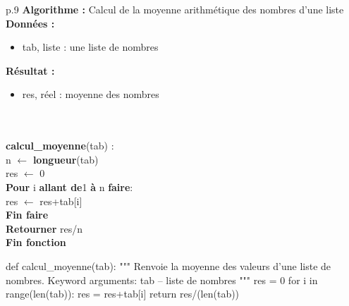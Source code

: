 \documentclass[10pt]{article}
\begin{document}
\begin{minipage}[c]{.48\linewidth}
\begin{pseudo}
\begin{center}
\begin{tabular}{p{.9\textwidth}}
\hline
\textbf{Algorithme :} Calcul de la moyenne arithmétique des nombres d'une liste\\
\hline
\textbf{Données :}
\begin{itemize}
\item \textsf{tab}, liste : une liste de nombres
\end{itemize}
\textbf{Résultat :} 
\begin{itemize}
\item \textsf{res}, réel : moyenne des nombres
\end{itemize} \\
\\
\textbf{calcul\_moyenne}(\textsf{tab}) :\\
\hspace{.4cm}\textsf{n} $\leftarrow$ \textbf{longueur}(\textsf{tab}) \\
\hspace{.4cm}\textsf{res} $\leftarrow$ \textsf{0} \\
\hspace{.4cm}\textbf{Pour} \textsf{i} \textbf{allant de}\textsf{1} \textbf{à} \textsf{n} \textbf{faire}: \\
\hspace{.8cm} \textsf{res  $\leftarrow$ res+tab[i]} \\
\hspace{.4cm}\textbf{Fin faire} \\
\hspace{.4cm}\textbf{Retourner} \textsf{res/n}\\
\textbf{Fin fonction} \\
\hline
\end{tabular}
\end{center}
\end{pseudo}
\end{minipage} \hfill
\begin{minipage}[c]{.48\linewidth}
\begin{py}
\begin{python}
def calcul_moyenne(tab):
    """ 
    Renvoie la moyenne des valeurs d'une liste de 
    nombres.
    Keyword arguments:
    tab -- liste de nombres
    """
    res = 0
    for i in range(len(tab)):
        res = res+tab[i]
    return res/(len(tab))
\end{python}
\end{py}    
\end{minipage}
\end{document}
